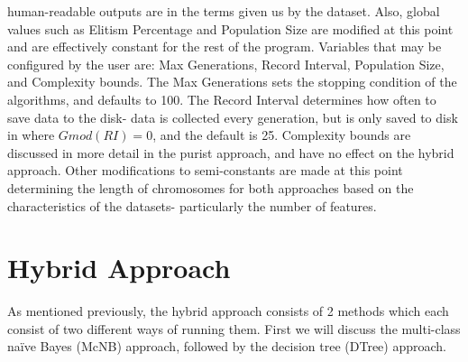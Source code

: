 human-readable outputs are in the terms given us by the dataset.  Also, global
values such as Elitism Percentage and Population Size are modified at this point
and are effectively constant for the rest of the program.  Variables that may be
configured by the user are: Max Generations, Record Interval, Population Size,
and Complexity bounds.  The Max Generations sets the stopping condition of the
algorithms, and defaults to 100.  The Record Interval determines how often to
save data to the disk- data is collected every generation, but is only saved to
disk in where $G mod(RI) = 0$, and the default is 25.  Complexity bounds are
discussed in more detail in the purist approach, and have no effect on the
hybrid approach.  Other modifications to semi-constants are made at this point
determining the length of chromosomes for both approaches based on the
characteristics of the datasets- particularly the number of features.
\section{Hybrid Approach}
As mentioned previously, the hybrid approach consists of 2 methods which each
consist of two different ways of running them.  First we will discuss the
multi-class na\"ive Bayes (McNB) approach, followed by the decision tree (DTree)
approach.
